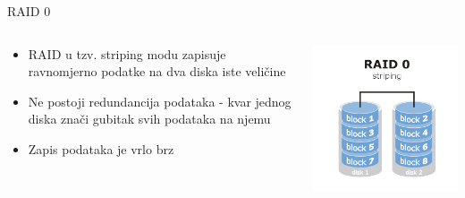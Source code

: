 \documentclass[croatian,t]{beamer} %
\begin{document}
    \begin{frame}{RAID 0}
    	\begin{columns}[c]
    		\begin{column}{6cm}
    			\begin{itemize}
    				\item RAID u tzv. striping modu zapisuje ravnomjerno podatke na dva diska iste veličine
   					\item Ne postoji redundancija podataka - kvar jednog diska znači gubitak svih podataka na njemu
   					\item Zapis podataka je vrlo brz
    			\end{itemize}
    		\end{column}
    		\begin{column}{4cm}
    			\includegraphics[width=1\textwidth]{../pics/raid0.png}
    		\end{column}
    	\end{columns}
    \end{frame}
    
\end{document}
